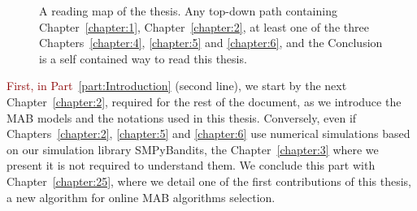 \begin{figure}[h!]
{
    }
    \caption[Organization of the thesis: a reading map.]{A reading map of the thesis. Any top-down path containing Chapter~\ref{chapter:1}, Chapter~\ref{chapter:2}, at least one of the three Chapters~\ref{chapter:4}, \ref{chapter:5} and \ref{chapter:6}, and the Conclusion is a self contained way to read this thesis.}
    \label{fig:1:organization}
\end{figure}

\textcolor{darkred}{First, in Part~\ref{part:Introduction}} (second line), we start by the next Chapter~\ref{chapter:2}, required for the rest of the document, as we introduce the MAB models and the notations used in this thesis.
Conversely, even if Chapters~\ref{chapter:2}, \ref{chapter:5} and \ref{chapter:6} use numerical simulations based on our simulation library SMPyBandits, the Chapter~\ref{chapter:3} where we present it is not required to understand them.
We conclude this part with Chapter~\ref{chapter:25}, where we detail one of the first contributions of this thesis, a new algorithm for online MAB algorithms selection.

